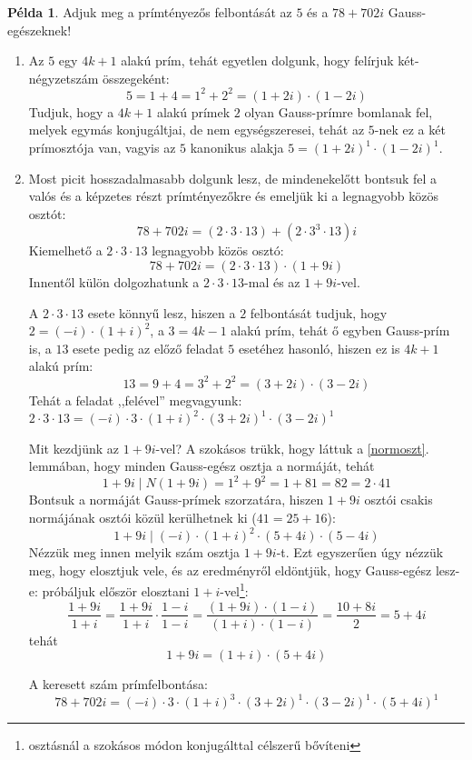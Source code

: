 \documentclass[12pt]{book}
\theoremstyle{plain} %
\theoremstyle{definition} %
\newtheorem{pl}{Példa}[section]
\theoremstyle{remark}
\numberwithin{equation}{section}  %
\begin{document}
	\begin{pl}
		Adjuk meg a prímtényezős felbontását az $5$ és a $78+702 i$ Gauss-egészeknek!
		
		\begin{enumerate}[label = (\alph*)]
			\item{Az $5$ egy $4k+1$ alakú prím, tehát egyetlen dolgunk, hogy felírjuk két-négyzetszám összegeként:
			\[ 5 = 1+4 = 1^2+2^2 = (1+2i)\cdot (1-2i)  \]	
			Tudjuk, hogy a $4k+1$ alakú prímek $2$ olyan Gauss-prímre bomlanak fel, melyek egymás konjugáltjai, de nem egységszeresei, tehát az $5$-nek ez a két prímosztója van, vagyis az $5$ kanonikus alakja $5=(1+2i)^1\cdot (1-2i)^1$.
		}
		\item{Most picit hosszadalmasabb dolgunk lesz, de mindenekelőtt bontsuk fel a valós és a képzetes részt prímtényezőkre és emeljük ki a legnagyobb közös osztót:
		\[ 78+702 i = (2\cdot 3\cdot 13) + (2\cdot 3^3\cdot 13) i \]
		Kiemelhető a $2\cdot 3\cdot 13$ legnagyobb közös osztó:
		\[ 78 + 702 i = (2\cdot 3\cdot 13) \cdot (1+9i) \]
		Innentől külön dolgozhatunk a $2\cdot 3\cdot 13$-mal és az $1+9i$-vel.
		
		A $2\cdot 3\cdot 13$ esete könnyű lesz, hiszen a $2$ felbontását tudjuk, hogy $2=(-i)\cdot (1+i)^2$, a $3=4k-1$ alakú prím, tehát ő egyben Gauss-prím is, a $13$ esete pedig az előző feladat $5$ esetéhez hasonló, hiszen ez is $4k+1$ alakú prím:
		\[ 13 = 9+4 = 3^2+2^2 = (3+2i)\cdot (3-2i)  \]
		Tehát a feladat ,,felével'' megvagyunk: $2\cdot 3\cdot 13 = (-i)\cdot 3\cdot (1+i)^2\cdot (3+2i)^1\cdot (3-2i)^1$
		
		Mit kezdjünk az $1+9i$-vel? A szokásos trükk, hogy láttuk a \ref{normoszt}. lemmában, hogy minden Gauss-egész osztja a normáját, tehát
		\[ 1+9i \mid N(1+9i) = 1^2+9^2 = 1+81 = 82 = 2\cdot 41  \]
		Bontsuk a normáját Gauss-prímek szorzatára, hiszen $1+9i$ osztói csakis normájának osztói közül kerülhetnek ki ($41 = 25+16$):
		\[ 1+9i \mid (-i)\cdot (1+i)^2\cdot (5+4i)\cdot (5-4i)  \]
		Nézzük meg innen melyik szám osztja $1+9i$-t. Ezt egyszerűen úgy nézzük meg, hogy elosztjuk vele, és az eredményről eldöntjük, hogy Gauss-egész lesz-e: próbáljuk először elosztani $1+i$-vel\footnote{osztásnál a szokásos módon konjugálttal célszerű bővíteni}:
		\[ \dfrac{1+9i}{1+i} = \dfrac{1+9i}{1+i} \cdot \dfrac{1-i}{1-i} = \dfrac{(1+9i)\cdot(1-i)}{(1+i)\cdot (1-i)} = \dfrac{10+8i}{2} = 5+4i   \]
		tehát
		\[ 1+9i = (1+i)\cdot (5+4i)  \]
		
		A keresett szám prímfelbontása:
		\[ 78+702i = (-i)\cdot 3 \cdot (1+i)^3 \cdot (3+2i)^1\cdot (3-2i)^1\cdot (5+4i)^1  \]
		
		}
		\end{enumerate}
	\end{pl}
\end{document}
